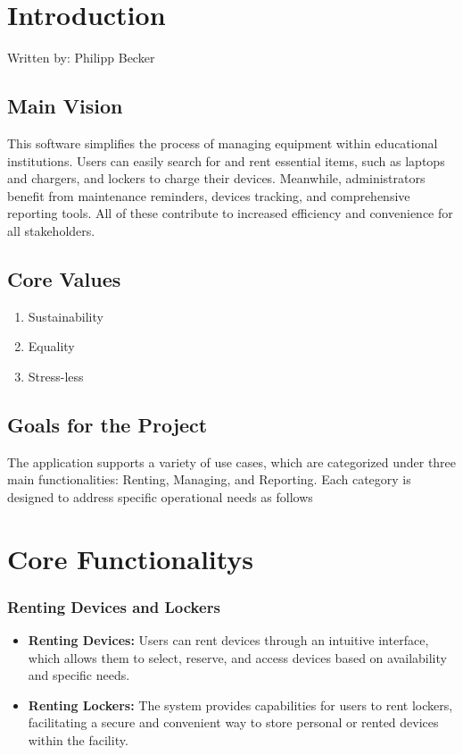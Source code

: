 \section{Introduction}
{\tiny Written by: Philipp Becker}\\

\subsection{Main Vision}
This software simplifies the process of managing equipment within educational institutions. Users can easily search for and rent essential items, such as laptops and chargers, and lockers to charge their devices.
Meanwhile, administrators benefit from maintenance reminders, devices tracking, and comprehensive reporting tools. All of these contribute to increased efficiency and convenience for all stakeholders.
\subsection{Core Values}
\begin{enumerate}
    \item Sustainability
    \item Equality
    \item Stress-less
\end{enumerate}

\subsection{Goals for the Project}
The application supports a variety of use cases, which are categorized under three main functionalities: Renting, Managing, and Reporting. Each category is designed to address specific operational needs as follows

\section{Core Functionalitys}
\subsubsection{Renting Devices and Lockers}
\begin{itemize}
\item \textbf{Renting Devices:} Users can rent devices through an intuitive interface, which allows them to select, reserve, and access devices based on availability and specific needs.
\item \textbf{Renting Lockers:} The system provides capabilities for users to rent lockers, facilitating a secure and convenient way to store personal or rented devices within the facility.
\end{itemize}

